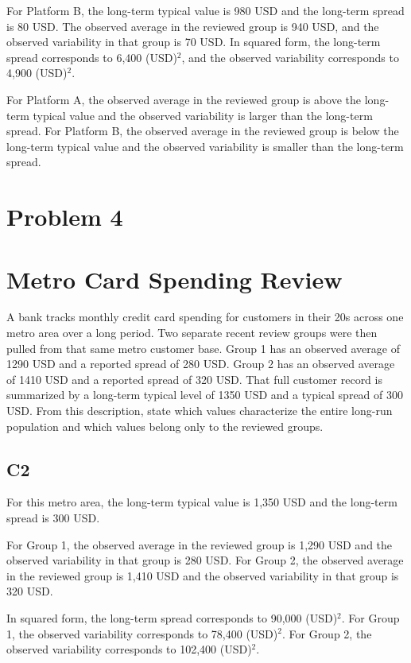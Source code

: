 \begin{ExamProblems}
		For Platform B, the long-term typical value is 980 USD and the long-term spread is 80 USD.
		The observed average in the reviewed group is 940 USD, and the observed variability in that group is 70 USD.
		In squared form, the long-term spread corresponds to 6,400 (USD)$^2$, and the observed variability corresponds to 4,900 (USD)$^2$.

		For Platform A, the observed average in the reviewed group is above the long-term typical value and the observed variability is larger than the long-term spread.
		For Platform B, the observed average in the reviewed group is below the long-term typical value and the observed variability is smaller than the long-term spread.


		\newpage
		\item
		\section{Problem 4}
		\section{Metro Card Spending Review}
		A bank tracks monthly credit card spending for customers in their 20s across one metro area over a long period.
		Two separate recent review groups were then pulled from that same metro customer base.
		Group 1 has an observed average of 1290 USD and a reported spread of 280 USD.
		Group 2 has an observed average of 1410 USD and a reported spread of 320 USD.
		That full customer record is summarized by a long-term typical level of 1350 USD and a typical spread of 300 USD.
		From this description, state which values characterize the entire long-run population and which values belong only to the reviewed groups.

\subsection*{C2}
		For this metro area, the long-term typical value is 1,350 USD and the long-term spread is 300 USD.

		For Group 1, the observed average in the reviewed group is 1,290 USD and the observed variability in that group is 280 USD.
		For Group 2, the observed average in the reviewed group is 1,410 USD and the observed variability in that group is 320 USD.

		In squared form, the long-term spread corresponds to 90,000 (USD)$^2$.
		For Group 1, the observed variability corresponds to 78,400 (USD)$^2$.
		For Group 2, the observed variability corresponds to 102,400 (USD)$^2$.


\end{ExamProblems}
